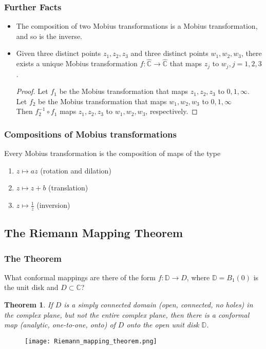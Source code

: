 \documentclass{article}
\newtheorem{theorem}{Theorem}[section]
\begin{document}
\subsubsection{Further Facts}
\begin{itemize}
\item The composition of two Mobius transformations is a Mobius transformation, and so is the inverse.
\item Given three distinct points $z_1, z_2, z_3$ and three distinct points $w_1, w_2, w_3$, there exists a unique Mobius transformation $f : \hat{\mathbb{C}} \to \hat{\mathbb{C}}$ that maps $z_j$ to $w_j, j = 1, 2, 3$.
\begin{proof}
Let $f_1$ be the Mobius transformation that maps $z_1, z_2, z_3$ to $0, 1, \infty$.\\
Let $f_2$ be the Mobius transformation that maps $w_1, w_2, w_3$ to $0, 1, \infty$\\
Then $f_2^{-1} \circ f_1$ maps $z_1, z_2, z_3$ to $w_1, w_2, w_3$, respectively.
\end{proof}
\end{itemize}

\subsubsection{Compositions of Mobius transformations}
Every Mobius transformation is the composition of maps of the type
\begin{enumerate}
\item $z \longmapsto az$ (rotation and dilation)
\item $z \longmapsto z + b$ (translation)
\item $z \longmapsto \frac{1}{z}$ (inversion)
\end{enumerate}

\subsection{The Riemann Mapping Theorem}
\subsubsection{The Theorem}
What conformal mappings are there of the form $f : \mathbb{D} \to D$, where $\mathbb{D} = B_1(0)$ is the unit disk and $D \subset \mathbb{C}$?
\begin{theorem}
If $D$ is a simply connected domain (open, connected, no holes) in the complex plane, but not the entire complex plane, then there is a conformal map (analytic, one-to-one, onto) of $D$ onto the open unit disk $\mathbb{D}$.
\end{theorem}
\begin{figure}[h]
\centering
\texttt{[image: Riemann\_mapping\_theorem.png]}
\end{figure}
\end{document}
